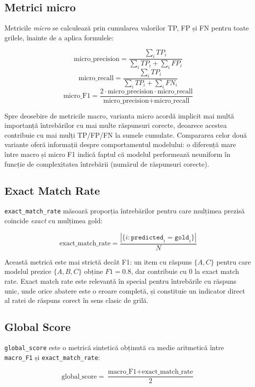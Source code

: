 \documentclass[12pt, a4paper, oneside, romanian]{teza-upb}
\begin{document}
\subsection{Metrici micro}

Metricile \textit{micro} se calculează prin cumularea valorilor TP, FP și FN pentru toate grilele, înainte de a aplica formulele:

\[ \text{micro\_precision} = \frac{\sum_{i} TP_i}{\sum_{i} TP_i + \sum_{i} FP_i} \]
\[ \text{micro\_recall} = \frac{\sum_{i} TP_i}{\sum_{i} TP_i + \sum_{i} FN_i} \]
\[ \text{micro\_F1} = \frac{2 \cdot \text{micro\_precision} \cdot \text{micro\_recall}}{\text{micro\_precision} + \text{micro\_recall}} \]

Spre deosebire de metricile macro, varianta micro acordă implicit mai multă importanță întrebărilor cu mai multe răspunsuri corecte, deoarece acestea contribuie cu mai mulți TP/FP/FN la sumele cumulate. Compararea celor două variante oferă informații despre comportamentul modelului: o diferență mare între macro și micro F1 indică faptul că modelul performează neuniform în funcție de complexitatea întrebării (numărul de răspunsuri corecte).

\subsection{Exact Match Rate}

\texttt{exact\_match\_rate} măsoară proporția întrebărilor pentru care mulțimea prezisă coincide \textit{exact} cu mulțimea gold:

\[ \text{exact\_match\_rate} = \frac{|\{i : \texttt{predicted}_i = \texttt{gold}_i\}|}{N} \]

Această metrică este mai strictă decât F1: un item cu răspuns $\{A, C\}$ pentru care modelul prezice $\{A, B, C\}$ obține $F1 = 0.8$, dar contribuie cu $0$ la exact match rate. Exact match rate este relevantă în special pentru întrebările cu răspuns unic, unde orice abatere este o eroare completă, și constituie un indicator direct al ratei de răspuns corect în sens clasic de grilă.

\subsection{Global Score}

\texttt{global\_score} este o metrică sintetică obținută ca medie aritmetică între \texttt{macro\_F1} și \texttt{exact\_match\_rate}:

\[ \text{global\_score} = \frac{\text{macro\_F1} + \text{exact\_match\_rate}}{2} \]
\end{document}
